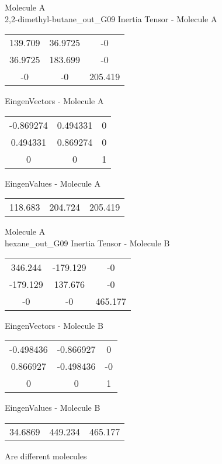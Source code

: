 \newpage
\begin{multicols}{2}
\begin{center}
Molecule A \\ 
2,2-dimethyl-butane_out_G09
Inertia Tensor - Molecule A \\
\vtab
\begin{tabular}{|c c c|}
139.709	 & 	36.9725	 & 	-0	 \\
36.9725	 & 	183.699	 & 	-0	 \\
-0	 & 	-0	 & 	205.419
\end{tabular}

\vtab
 EingenVectors - Molecule A     \\
\vtab
\begin{tabular}{|c c c|}
-0.869274	 & 	0.494331	 & 	0	 \\
0.494331	 & 	0.869274	 & 	0	 \\
0	 & 	0	 & 	1
\end{tabular}

\vtab
 EingenValues - Molecule A     \\
\vtab
\begin{tabular}{|c c c|}
118.683	 & 	204.724	 & 	205.419
\end{tabular}
\columnbreak
Molecule A \\ 
hexane_out_G09
Inertia Tensor - Molecule B \\
\vtab
\begin{tabular}{|c c c|}
346.244	 & 	-179.129	 & 	-0	 \\
-179.129	 & 	137.676	 & 	-0	 \\
-0	 & 	-0	 & 	465.177
\end{tabular}

\vtab
 EingenVectors - Molecule B     \\
\vtab
\begin{tabular}{|c c c|}
-0.498436	 & 	-0.866927	 & 	0	 \\
0.866927	 & 	-0.498436	 & 	-0	 \\
0	 & 	0	 & 	1
\end{tabular}

\vtab
 EingenValues - Molecule B     \\
\vtab
\begin{tabular}{|c c c|}
34.6869	 & 	449.234	 & 	465.177
\end{tabular}
\textcolor{NavyBlue}{\large Are different molecules}
\end{center}
\end{multicols}
